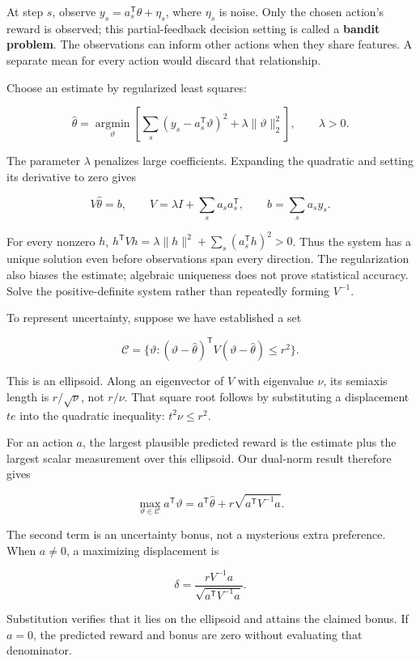At step \(s\), observe \(y_s=a_s^{\mathsf T}\theta+\eta_s\), where \(\eta_s\) is noise. Only the chosen action's reward is observed; this partial-feedback decision setting is called a \textbf{bandit problem}. The observations can inform other actions when they share features. A separate mean for every action would discard that relationship.

Choose an estimate by regularized least squares:

\[
\widehat\theta=\underset{\vartheta}{\operatorname{argmin}}
\left[\sum_s(y_s-a_s^{\mathsf T}\vartheta)^2
+\lambda\|\vartheta\|_2^2\right],\qquad\lambda>0.
\]

The parameter \(\lambda\) penalizes large coefficients. Expanding the quadratic and setting its derivative to zero gives

\[
V\widehat\theta=b,\qquad
V=\lambda I+\sum_s a_sa_s^{\mathsf T},\qquad
b=\sum_s a_sy_s.
\]

For every nonzero \(h\), \(h^{\mathsf T}Vh=\lambda\|h\|^2+\sum_s(a_s^{\mathsf T}h)^2>0\). Thus the system has a unique solution even before observations span every direction. The regularization also biases the estimate; algebraic uniqueness does not prove statistical accuracy. Solve the positive-definite system rather than repeatedly forming \(V^{-1}\).

To represent uncertainty, suppose we have established a set

\[
\mathcal C=\{\vartheta:
(\vartheta-\widehat\theta)^{\mathsf T}V
(\vartheta-\widehat\theta)\le r^2\}.
\]

This is an ellipsoid. Along an eigenvector of \(V\) with eigenvalue \(\nu\), its semiaxis length is \(r/\sqrt\nu\), not \(r/\nu\). That square root follows by substituting a displacement \(te\) into the quadratic inequality: \(t^2\nu\le r^2\).

For an action \(a\), the largest plausible predicted reward is the estimate plus the largest scalar measurement over this ellipsoid. Our dual-norm result therefore gives

\[
\max_{\vartheta\in\mathcal C}a^{\mathsf T}\vartheta
=a^{\mathsf T}\widehat\theta
+r\sqrt{a^{\mathsf T}V^{-1}a}.
\]

The second term is an uncertainty bonus, not a mysterious extra preference. When \(a\ne0\), a maximizing displacement is

\[
\delta=\frac{rV^{-1}a}{\sqrt{a^{\mathsf T}V^{-1}a}}.
\]

Substitution verifies that it lies on the ellipsoid and attains the claimed bonus. If \(a=0\), the predicted reward and bonus are zero without evaluating that denominator.

